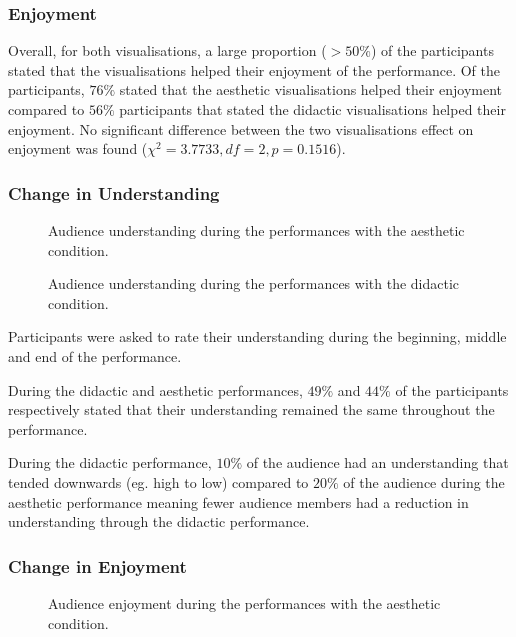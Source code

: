 \documentclass{sig-alternate}
\begin{document}
\subsubsection{Enjoyment}
Overall, for both visualisations, a large proportion ($> 50\%$) of the participants stated that the visualisations helped their enjoyment of the performance. Of the participants, $76\%$ stated that the aesthetic visualisations helped their enjoyment compared to $56\%$ participants that stated the didactic visualisations helped their enjoyment. No significant difference between the two visualisations effect on enjoyment was found ($\chi^2=3.7733,df=2,p=0.1516$).

\subsubsection{Change in Understanding}

\begin{figure}
\centering
{}
\caption{Audience understanding during the performances with the aesthetic condition.}
\end{figure}

\begin{figure}
\centering
{}
\caption{Audience understanding during the performances with the didactic condition.}
\end{figure}

Participants were asked to rate their understanding during the beginning, middle and end of the performance.

During the didactic and aesthetic performances, $49\%$ and $44\%$ of the participants respectively stated that their understanding remained the same throughout the performance.

During the didactic performance, $10\%$ of the audience had an understanding that tended downwards (eg. high to low) compared to $20\%$ of the audience during the aesthetic performance meaning fewer audience members had a reduction in understanding through the didactic performance.

\subsubsection{Change in Enjoyment}

\begin{figure}
\centering
{}
\caption{Audience enjoyment during the performances with the aesthetic condition.}
\end{figure}
\end{document}

